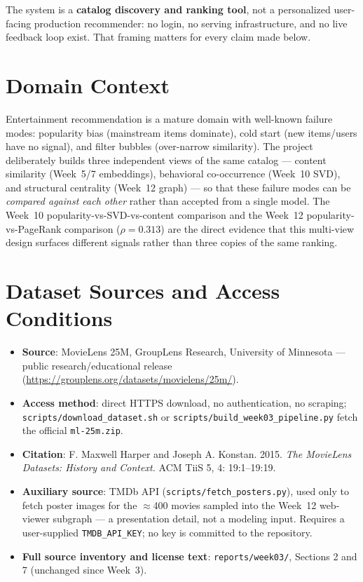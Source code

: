 \documentclass[12pt,a4paper]{article}
\begin{document}
The system is a \textbf{catalog discovery and ranking tool}, not a personalized user-facing
production recommender: no login, no serving infrastructure, and no live feedback loop exist. That
framing matters for every claim made below.

\section{Domain Context}

Entertainment recommendation is a mature domain with well-known failure modes: popularity bias
(mainstream items dominate), cold start (new items/users have no signal), and filter bubbles
(over-narrow similarity). The project deliberately builds three independent views of the same
catalog --- content similarity (Week~5/7 embeddings), behavioral co-occurrence (Week~10 SVD), and
structural centrality (Week~12 graph) --- so that these failure modes can be \emph{compared against
each other} rather than accepted from a single model. The Week~10 popularity-vs-SVD-vs-content
comparison and the Week~12 popularity-vs-PageRank comparison ($\rho=0.313$) are the direct evidence
that this multi-view design surfaces different signals rather than three copies of the same
ranking.

\section{Dataset Sources and Access Conditions}

\begin{itemize}[nosep]
  \item \textbf{Source}: MovieLens 25M, GroupLens Research, University of Minnesota --- public
    research/educational release (\url{https://grouplens.org/datasets/movielens/25m/}).
  \item \textbf{Access method}: direct HTTPS download, no authentication, no scraping;
    \texttt{scripts/download\_dataset.sh} or \texttt{scripts/build\_week03\_pipeline.py} fetch the
    official \texttt{ml-25m.zip}.
  \item \textbf{Citation}: F. Maxwell Harper and Joseph A. Konstan. 2015. \emph{The MovieLens
    Datasets: History and Context.} ACM TiiS 5, 4: 19:1--19:19.
  \item \textbf{Auxiliary source}: TMDb API (\texttt{scripts/fetch\_posters.py}), used only to fetch
    poster images for the $\approx$400 movies sampled into the Week~12 web-viewer subgraph --- a
    presentation detail, not a modeling input. Requires a user-supplied \texttt{TMDB\_API\_KEY}; no
    key is committed to the repository.
  \item \textbf{Full source inventory and license text}: \texttt{reports/week03/}, Sections 2 and 7
    (unchanged since Week~3).
\end{itemize}
\end{document}
